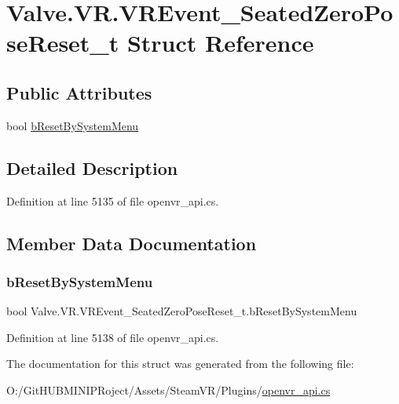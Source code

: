 \hypertarget{struct_valve_1_1_v_r_1_1_v_r_event___seated_zero_pose_reset__t}{}\section{Valve.\+V\+R.\+V\+R\+Event\+\_\+\+Seated\+Zero\+Pose\+Reset\+\_\+t Struct Reference}
\label{struct_valve_1_1_v_r_1_1_v_r_event___seated_zero_pose_reset__t}
\subsection*{Public Attributes}
\begin{DoxyCompactItemize}
\item 
bool \mbox{\hyperlink{struct_valve_1_1_v_r_1_1_v_r_event___seated_zero_pose_reset__t_ab19d7001f71d8a22da329b9c584ed582}{b\+Reset\+By\+System\+Menu}}
\end{DoxyCompactItemize}


\subsection{Detailed Description}


Definition at line 5135 of file openvr\+\_\+api.\+cs.



\subsection{Member Data Documentation}
\mbox{\label{struct_valve_1_1_v_r_1_1_v_r_event___seated_zero_pose_reset__t_ab19d7001f71d8a22da329b9c584ed582}} 
\subsubsection{\texorpdfstring{bResetBySystemMenu}{bResetBySystemMenu}}
{\footnotesize\ttfamily bool Valve.\+V\+R.\+V\+R\+Event\+\_\+\+Seated\+Zero\+Pose\+Reset\+\_\+t.\+b\+Reset\+By\+System\+Menu}



Definition at line 5138 of file openvr\+\_\+api.\+cs.



The documentation for this struct was generated from the following file\+:\begin{DoxyCompactItemize}
\item 
O\+:/\+Git\+H\+U\+B\+M\+I\+N\+I\+P\+Roject/\+Assets/\+Steam\+V\+R/\+Plugins/\mbox{\hyperlink{openvr__api_8cs}{openvr\+\_\+api.\+cs}}\end{DoxyCompactItemize}
